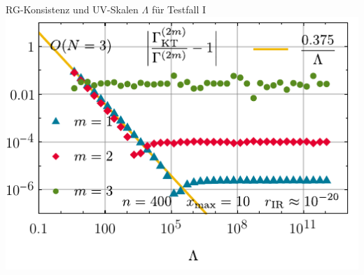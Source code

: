 \begin{frame}{RG-Konsistenz und UV-Skalen $\Lambda$ für Testfall I}
	\label{0dLambda}
	\centering
	\includegraphics[width=0.6\framewidth]{../0d/figures/sc_i_on_3_n_400_xmax_10_rir_10e-20_cutoff_test.pdf}
\end{frame}


